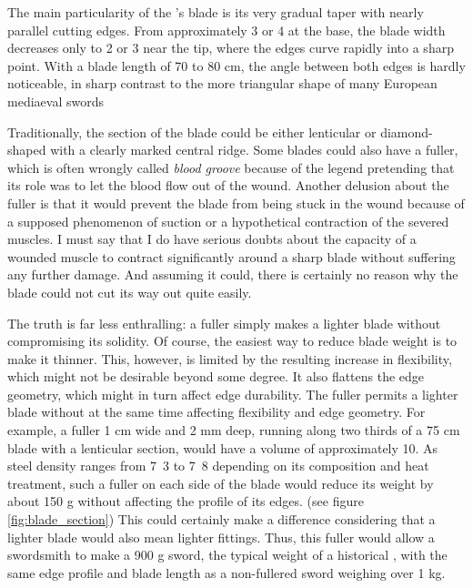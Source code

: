 The main particularity of the \Jian{}'s blade is its very gradual taper with nearly parallel cutting edges. From approximately 3 or \unit{4}{\centi\meter} at the base, the blade width decreases only to 2 or \unit{3}{\centi\meter} near the tip, where the edges curve rapidly into a sharp point.
With a blade length of 70 to 80 cm, the angle between both edges is hardly noticeable, in sharp contrast to the more triangular shape of many European mediaeval swords

Traditionally, the section of the blade could be either lenticular or diamond-shaped with a clearly marked central ridge.
Some blades could also have a fuller, which is often wrongly called \emph{blood groove} because of the legend pretending that its role was to let the blood flow out of the wound.
Another delusion about the fuller is that it would prevent the blade from being stuck in the wound because of a supposed phenomenon of suction or a hypothetical contraction of the severed muscles.
I must say that I do have serious doubts about the capacity of a wounded muscle to contract significantly around a sharp blade without suffering any further damage. And assuming it could, there is certainly no reason why the blade could not cut its way out quite easily.

The truth is far less enthralling: a fuller simply makes a lighter blade without compromising its solidity. Of course, the easiest way to reduce blade weight is to make it thinner. This, however, is limited by the resulting increase in flexibility, which might not be desirable beyond some degree. It also flattens the edge geometry, which might in turn affect edge durability. The fuller permits a lighter blade without at the same time affecting flexibility and edge geometry.
For example, a fuller 1 cm wide and 2 mm deep, running along two thirds of a 75 cm blade with a lenticular section, would have a volume of approximately \unit{10}{\centi\meter\cubed}. As steel density ranges from \unit{7.3}{\kilo\gram \per \deci\meter\cubed} to \unit{7.8}{\kilo\gram \per \deci\meter\cubed} depending on its composition and heat treatment, such a fuller on each side of the blade would reduce its weight by about 150 g without affecting the profile of its edges. (see figure \ref{fig:blade_section}) 
This could certainly make a difference considering that a lighter blade would also mean lighter fittings. Thus, this fuller would allow a swordsmith to make a 900 g sword, the typical weight of a historical \Jian{}, with the same edge profile and blade length as a non-fullered sword weighing over 1 kg.


